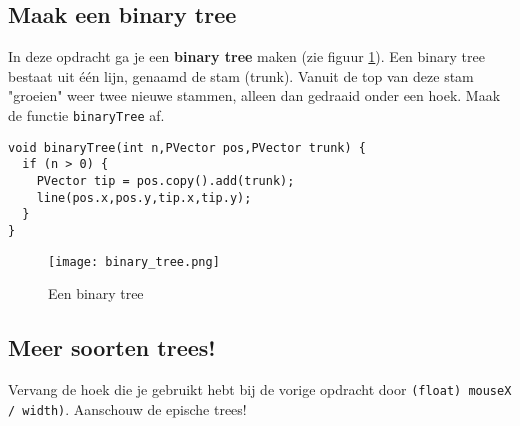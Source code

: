 \documentclass[../syllabus.tex]{subfiles}
\begin{document}
\subsection{Maak een binary tree}
In deze opdracht ga je een \textbf{binary tree} maken (zie figuur \ref{fig:binary_tree}). Een binary tree bestaat uit \'e\'en lijn, genaamd de stam (trunk). Vanuit de top van deze stam "groeien" weer twee nieuwe stammen, alleen dan gedraaid onder een hoek. Maak de functie \texttt{binaryTree} af.
\begin{lstlisting}
void binaryTree(int n,PVector pos,PVector trunk) {
  if (n > 0) {
    PVector tip = pos.copy().add(trunk);
    line(pos.x,pos.y,tip.x,tip.y);
  }
}
\end{lstlisting}
\begin{figure}[H]
	\centering
	\texttt{[image: binary\_tree.png]}
	\caption{Een binary tree}
	\label{fig:binary_tree}
\end{figure}

\subsection{Meer soorten trees!}
Vervang de hoek die je gebruikt hebt bij de vorige opdracht door \texttt{(float) mouseX / width)}. Aanschouw de epische trees!
\end{document}
